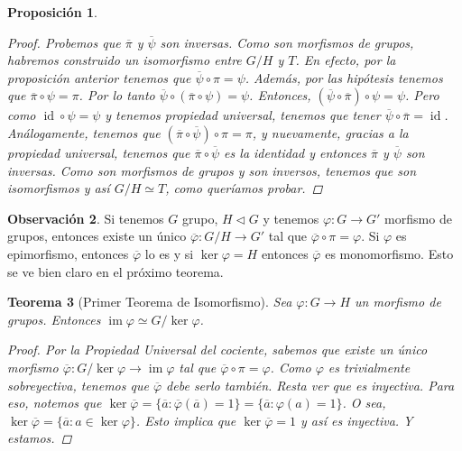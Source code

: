 \documentclass[12pt]{book}
\newtheorem{teo}{Teorema}[section]
\newtheorem{prop}[teo]{Proposición}
\theoremstyle{definition}
\newtheorem{obs}[teo]{Observación}
\DeclareMathOperator{\id}{id}
\DeclareMathOperator{\im}{im}
\begin{document}
\begin{prop}
\begin{proof}
Probemos que $\overline{\pi}$ y $\overline{\psi}$ son inversas. Como son morfismos de grupos, habremos construido un isomorfismo entre $G/H$ y $T$. En efecto, por la proposición anterior tenemos que $\overline{\psi}\circ \pi = \psi$. Además, por las hipótesis tenemos que $\overline{\pi}\circ \psi = \pi$. Por lo tanto $\overline{\psi}\circ (\overline{\pi}\circ \psi) = \psi$. Entonces, $(\overline{\psi}\circ \overline{\pi})\circ \psi = \psi$. Pero como $\id\circ \psi = \psi$ y tenemos propiedad universal, tenemos que tener $\overline{\psi}\circ\overline{\pi}=\id$. Análogamente, tenemos que $(\overline{\pi}\circ\overline{\psi})\circ \pi = \pi$, y nuevamente, gracias a la propiedad universal, tenemos que $\overline{\pi}\circ \overline{\psi}$ es la identidad y entonces $\overline{\pi}$ y $\overline{\psi}$ son inversas. Como son morfismos de grupos y son inversos, tenemos que son isomorfismos y así $G/H\simeq T$, como queríamos probar.

\end{proof}

\end{prop}
\begin{obs}
Si tenemos $G$ grupo, $H\triangleleft G$ y tenemos $\varphi:G\to G'$ morfismo de grupos, entonces existe un único $\overline{\varphi}:G/H\to G'$ tal que $\overline{\varphi}\circ \pi = \varphi$. Si $\varphi$ es epimorfismo, entonces $\overline{\varphi}$ lo es y si $\ker \varphi = H$ entonces $\overline{\varphi}$ es monomorfismo. Esto se ve bien claro en el próximo teorema.
\end{obs}

\begin{teo}[Primer Teorema de Isomorfismo]
Sea $\varphi:G\to H$ un morfismo de grupos. Entonces $\im\varphi \simeq G/\ker\varphi$.
\begin{proof}

Por la Propiedad Universal del cociente, sabemos que existe un único morfismo $\overline{\varphi}:G/\ker\varphi \to\im\varphi$ tal que $\overline{\varphi}\circ \pi = \varphi$. Como $\varphi$ es trivialmente sobreyectiva, tenemos que $\overline{\varphi}$ debe serlo también. Resta ver que es inyectiva. Para eso, notemos que $\ker \overline{\varphi} = \{\overline{a} : \overline{\varphi}(\overline{a}) = 1\} = \{\overline{a} : \varphi(a)=1\}$. O sea, $\ker \overline{\varphi} = \{\overline{a} : a\in \ker \varphi\}$. Esto implica que $\ker \overline{\varphi} = 1$ y así es inyectiva. Y estamos.

\end{proof}
\end{teo}
\end{document}
